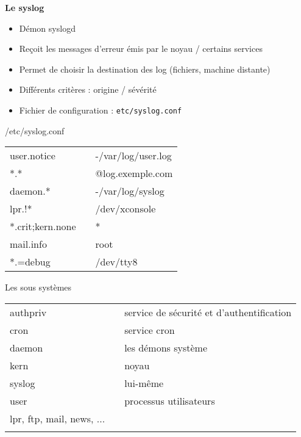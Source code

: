 \documentclass[french]{beamer}
\begin{document}
\begin{frame}
\textbf{Le syslog}
\begin{itemize}

\item Démon syslogd
\item Reçoit les messages d'erreur émis par le noyau / certains services
\item Permet de choisir la destination des log (fichiers, machine distante)
\item Différents critères : origine / sévérité
\item Fichier de configuration : \texttt{etc/syslog.conf}

\end{itemize}
\end{frame}

\begin{frame}
\begin{block}{/etc/syslog.conf}
\begin{tabular}{l l l}
user.notice  & & -/var/log/user.log \\
*.*       &    &  @log.exemple.com \\
daemon.*  &    &      -/var/log/syslog \\
lpr.!*   & &  /dev/xconsole \\ 
*.crit;kern.none   &     &    * \\
mail.info  & & root \\
*.=debug   &  & /dev/tty8   \\
\end{tabular}
\end{block}
\end{frame}

\begin{frame}
\begin{block}{Les sous systèmes}
\begin{tabular}{l l l}
authpriv   & &    service de sécurité et d'authentification\\
cron  &  &        service cron \\
daemon  &  &      les démons système\\
kern  &   &      noyau \\
syslog  &  &     lui-même\\
user  &   &      processus utilisateurs\\
lpr, ftp, mail, news, ...\\ & &
\end{tabular}
\end{block}
\end{frame}
\end{document}
